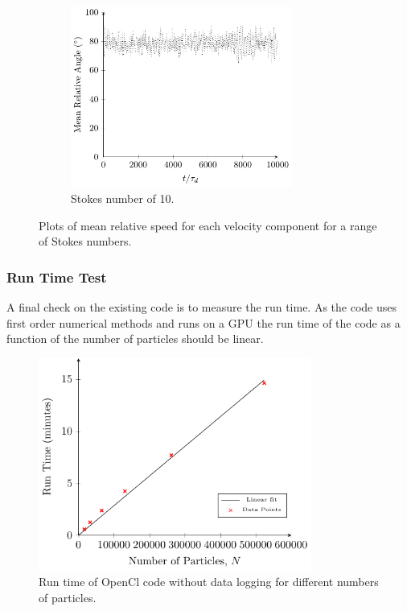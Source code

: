 \documentclass[../Interim_Report_Master]{subfiles}
\begin{document}
\begin{figure}[H]
\begin{subfigure}[t]{0.6\textwidth}
		\includegraphics[width=0.8\textwidth]{./Diagrams/Statistical_Verification_Test/stk_10/Statistical_Verification_Test_Angle_stk_10.pdf}
		\caption{Stokes number of 10.}
		\label{rel_ang_stk_10}
	\end{subfigure}
	\caption{Plots of mean relative speed for each velocity component for a range of Stokes numbers.}
	\label{rel_ang}
\end{figure}

\subsubsection{Run Time Test}
A final check on the existing code is to measure the run time. As the code uses first order numerical methods and runs on a GPU the run time of the code as a function of the number of particles should be linear.

\begin{figure}[H]
	\centering
	\includegraphics[width=0.8\textwidth]{./Diagrams/Timing/Oranges_Time_Test.pdf}
	\caption{Run time of OpenCl code without data logging for different numbers of particles.}
	\label{oranges_time_test}
\end{figure}
\end{document}
